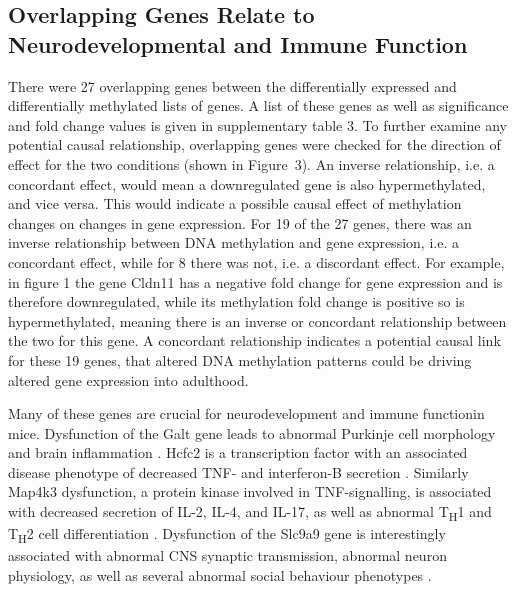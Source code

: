 \documentclass{bioinfo}
\begin{document}
\begin{results}
\subsection{Overlapping Genes Relate to Neurodevelopmental and Immune Function}
There were 27 overlapping genes between the differentially expressed and differentially methylated lists of genes. A list of these genes as well as significance and fold change values is given in supplementary table 3. To further examine any potential causal relationship, overlapping genes were checked for the direction of effect for the two conditions (shown in Figure~3\vphantom{\ref{fig:03}}). An inverse relationship, i.e. a concordant effect, would mean a downregulated gene is also hypermethylated, and vice versa. This would indicate a possible causal effect of methylation changes on changes in gene expression.  For 19 of the 27 genes, there was an inverse relationship between DNA methylation and gene expression, i.e. a concordant effect, while for 8 there was not, i.e. a discordant effect. For example, in figure 1 the gene Cldn11 has a negative fold change for gene expression and is therefore downregulated, while its methylation fold change is positive so is hypermethylated, meaning there is an inverse or concordant relationship between the two for this gene. A concordant relationship indicates a potential causal link for these 19 genes, that altered DNA methylation patterns could be driving altered gene expression into adulthood.

Many of these genes are crucial for neurodevelopment and immune functionin mice. Dysfunction of the Galt gene leads to abnormal Purkinje cell morphology and brain inflammation \citep{tang_subfertility_2014}. Hcfc2 is a transcription factor with an associated disease phenotype of decreased TNF- and interferon-B secretion \citep{sun_hcfc2_2017}. Similarly Map4k3 dysfunction, a protein kinase involved in TNF-\textalpha signalling, is associated with decreased secretion of IL-2, IL-4, and IL-17, as well as abnormal T\textsubscript{H}1 and T\textsubscript{H}2 cell differentiation \citep{chuang_kinase_2011}. Dysfunction of the Slc9a9 gene is interestingly associated with abnormal CNS synaptic transmission, abnormal neuron physiology, as well as several abnormal social behaviour phenotypes \citep{yang_autism_2016, ullman_mouse_2018}.


\end{results}
\end{document}
